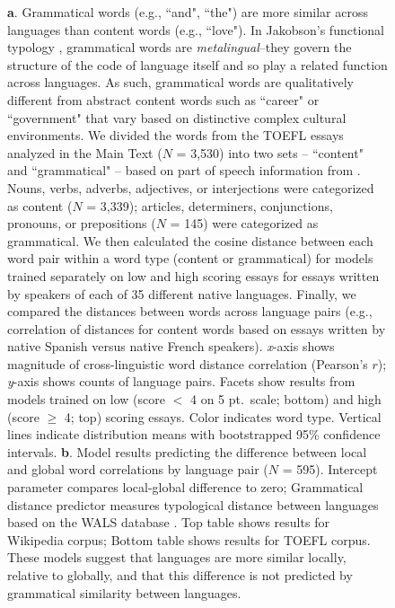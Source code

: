 \documentclass[9pt,twoside,lineno]{pnas-new}
\begin{document}
\begin{figure}[h]
  \caption{{\textbf a.} Grammatical words (e.g., ``and", ``the") are more similar across languages than content words (e.g., ``love"). In Jakobson's functional typology \cite{jakobson1990language}, grammatical words are \textit{metalingual}--they govern the structure of the code of language itself and so play a related function across languages. As such, grammatical words are qualitatively different from abstract content words such as ``career" or ``government" that vary based on distinctive complex cultural environments. We divided the words from the TOEFL essays analyzed in the Main Text ($N$ = 3,530) into two sets -- ``content" and ``grammatical"  -- based on  part of speech information from \cite{brysbaert2012adding}. Nouns, verbs, adverbs, adjectives, or interjections were categorized as content ($N$ = 3,339); articles, determiners, conjunctions, pronouns, or prepositions ($N$ = 145) were categorized as grammatical. We then calculated the cosine distance between each word pair within a word type (content or grammatical) for models trained separately on low and high scoring essays for essays written by speakers of each of 35 different native languages. Finally, we compared the distances between words across language pairs (e.g., correlation of distances for content words based on essays written by native Spanish versus native French speakers). {\it x}-axis shows magnitude of cross-linguistic word distance correlation (Pearson's $r$); {\it y}-axis shows counts of language pairs. Facets show results from models trained on low (score $<$ 4 on 5 pt.\ scale; bottom) and high (score $\geq$ 4; top) scoring essays. Color indicates word type. Vertical lines indicate distribution means with bootstrapped 95\% confidence intervals. {\textbf b.} Model results predicting the difference between local and global word correlations by language pair ($N$ = 595). Intercept parameter  compares local-global difference to zero; Grammatical distance predictor measures typological distance between languages based on the WALS database \cite{dediu2018trees,wals2013}. Top table shows results for Wikipedia corpus; Bottom table shows results for TOEFL corpus. These models suggest that languages are more similar locally, relative to globally, and that this difference is not predicted by grammatical similarity between languages.}
  \end{figure}

\pagebreak
\clearpage
\end{document}
